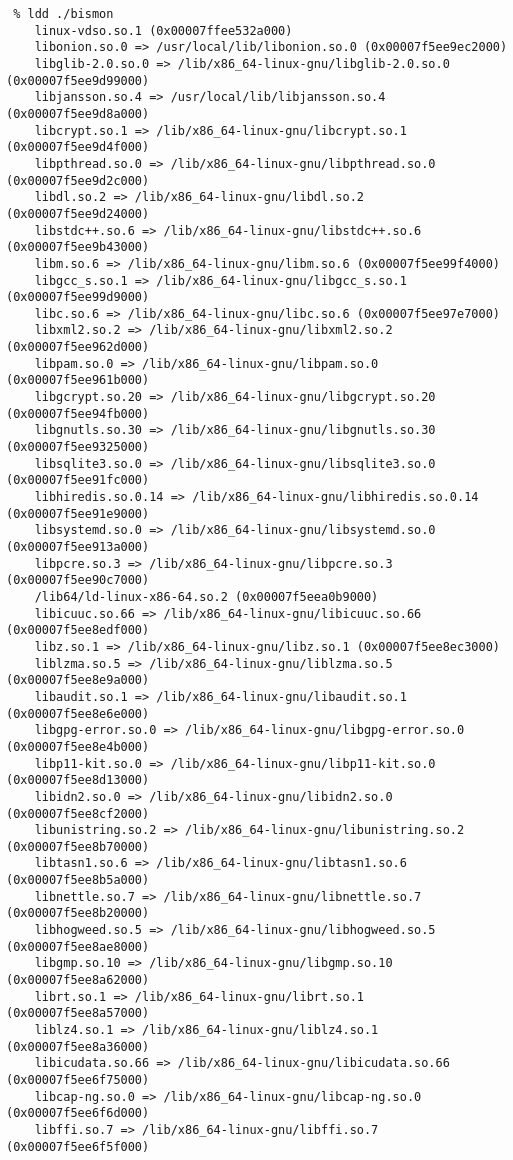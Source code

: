 \begin{appendices}
\begin{relsize}{-1}
\begin{verbatim}
 % ldd ./bismon
	linux-vdso.so.1 (0x00007ffee532a000)
	libonion.so.0 => /usr/local/lib/libonion.so.0 (0x00007f5ee9ec2000)
	libglib-2.0.so.0 => /lib/x86_64-linux-gnu/libglib-2.0.so.0 (0x00007f5ee9d99000)
	libjansson.so.4 => /usr/local/lib/libjansson.so.4 (0x00007f5ee9d8a000)
	libcrypt.so.1 => /lib/x86_64-linux-gnu/libcrypt.so.1 (0x00007f5ee9d4f000)
	libpthread.so.0 => /lib/x86_64-linux-gnu/libpthread.so.0 (0x00007f5ee9d2c000)
	libdl.so.2 => /lib/x86_64-linux-gnu/libdl.so.2 (0x00007f5ee9d24000)
	libstdc++.so.6 => /lib/x86_64-linux-gnu/libstdc++.so.6 (0x00007f5ee9b43000)
	libm.so.6 => /lib/x86_64-linux-gnu/libm.so.6 (0x00007f5ee99f4000)
	libgcc_s.so.1 => /lib/x86_64-linux-gnu/libgcc_s.so.1 (0x00007f5ee99d9000)
	libc.so.6 => /lib/x86_64-linux-gnu/libc.so.6 (0x00007f5ee97e7000)
	libxml2.so.2 => /lib/x86_64-linux-gnu/libxml2.so.2 (0x00007f5ee962d000)
	libpam.so.0 => /lib/x86_64-linux-gnu/libpam.so.0 (0x00007f5ee961b000)
	libgcrypt.so.20 => /lib/x86_64-linux-gnu/libgcrypt.so.20 (0x00007f5ee94fb000)
	libgnutls.so.30 => /lib/x86_64-linux-gnu/libgnutls.so.30 (0x00007f5ee9325000)
	libsqlite3.so.0 => /lib/x86_64-linux-gnu/libsqlite3.so.0 (0x00007f5ee91fc000)
	libhiredis.so.0.14 => /lib/x86_64-linux-gnu/libhiredis.so.0.14 (0x00007f5ee91e9000)
	libsystemd.so.0 => /lib/x86_64-linux-gnu/libsystemd.so.0 (0x00007f5ee913a000)
	libpcre.so.3 => /lib/x86_64-linux-gnu/libpcre.so.3 (0x00007f5ee90c7000)
	/lib64/ld-linux-x86-64.so.2 (0x00007f5eea0b9000)
	libicuuc.so.66 => /lib/x86_64-linux-gnu/libicuuc.so.66 (0x00007f5ee8edf000)
	libz.so.1 => /lib/x86_64-linux-gnu/libz.so.1 (0x00007f5ee8ec3000)
	liblzma.so.5 => /lib/x86_64-linux-gnu/liblzma.so.5 (0x00007f5ee8e9a000)
	libaudit.so.1 => /lib/x86_64-linux-gnu/libaudit.so.1 (0x00007f5ee8e6e000)
	libgpg-error.so.0 => /lib/x86_64-linux-gnu/libgpg-error.so.0 (0x00007f5ee8e4b000)
	libp11-kit.so.0 => /lib/x86_64-linux-gnu/libp11-kit.so.0 (0x00007f5ee8d13000)
	libidn2.so.0 => /lib/x86_64-linux-gnu/libidn2.so.0 (0x00007f5ee8cf2000)
	libunistring.so.2 => /lib/x86_64-linux-gnu/libunistring.so.2 (0x00007f5ee8b70000)
	libtasn1.so.6 => /lib/x86_64-linux-gnu/libtasn1.so.6 (0x00007f5ee8b5a000)
	libnettle.so.7 => /lib/x86_64-linux-gnu/libnettle.so.7 (0x00007f5ee8b20000)
	libhogweed.so.5 => /lib/x86_64-linux-gnu/libhogweed.so.5 (0x00007f5ee8ae8000)
	libgmp.so.10 => /lib/x86_64-linux-gnu/libgmp.so.10 (0x00007f5ee8a62000)
	librt.so.1 => /lib/x86_64-linux-gnu/librt.so.1 (0x00007f5ee8a57000)
	liblz4.so.1 => /lib/x86_64-linux-gnu/liblz4.so.1 (0x00007f5ee8a36000)
	libicudata.so.66 => /lib/x86_64-linux-gnu/libicudata.so.66 (0x00007f5ee6f75000)
	libcap-ng.so.0 => /lib/x86_64-linux-gnu/libcap-ng.so.0 (0x00007f5ee6f6d000)
	libffi.so.7 => /lib/x86_64-linux-gnu/libffi.so.7 (0x00007f5ee6f5f000)
\end{verbatim}
\end{relsize}


\end{appendices}
